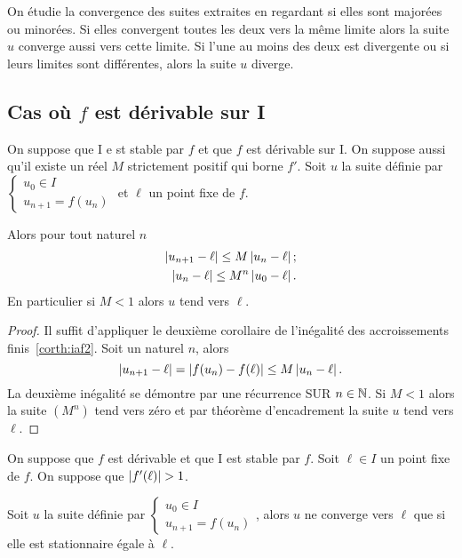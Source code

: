 On étudie la convergence des suites extraites en regardant si elles sont majorées ou minorées. Si elles convergent toutes les deux vers la même limite alors la suite $u$ converge aussi vers cette limite. Si l'une au moins des deux est divergente ou si leurs limites sont différentes, alors la suite $u$ diverge.

\subsection{Cas où $f$ est dérivable sur I}

\begin{prop}
  On suppose que I e st stable par $f$ et que $f$ est dérivable sur I. On suppose aussi qu'il existe un réel $M$ strictement positif qui borne $f'$. Soit $u$ la suite définie par $\begin{cases} u_0 \in I \\ u_{n+1}=f(u_n) \end{cases}$ et $\ell$ un point fixe de $f$.

  Alors pour tout naturel $n$
  \begin{align}
    \left\lvert u_{n+1}-\ell\right\rvert \leq M \left\lvert u_n-\ell\right\rvert; \\
    \left\lvert u_n-\ell\right\rvert \leq M^n \left\lvert u_0-\ell\right\rvert.
  \end{align}
  En particulier si $M < 1$ alors $u$ tend vers $\ell$.
\end{prop}
\begin{proof}
  Il suffit d'appliquer le deuxième corollaire de l'inégalité des accroissements finis~\ref{corth:iaf2}. Soit un naturel $n$, alors
  \begin{equation}
    \left\lvert u_{n+1}-\ell\right\rvert=\left\lvert f(u_n)-f(\ell)\right\rvert \leq M \left\lvert u_n-\ell\right\rvert.
  \end{equation}
  La deuxième inégalité se démontre par une récurrence SUR $n \in \mathbb{N}$. Si $M<1$ alors la suite $(M^n)$ tend vers zéro et par théorème d'encadrement la suite $u$ tend vers $\ell$.
\end{proof}
\begin{prop}
  On suppose que $f$ est dérivable et que I est stable par $f$. Soit $\ell \in I$ un point fixe de $f$. On suppose que $\left\lvert f'(\ell)\right\rvert>1$.

  Soit $u$ la suite définie par $\begin{cases} u_0 \in I \\ u_{n+1}=f(u_n) \end{cases}$, alors $u$ ne converge vers $\ell$ que si elle est stationnaire égale à $\ell$.
\end{prop}
